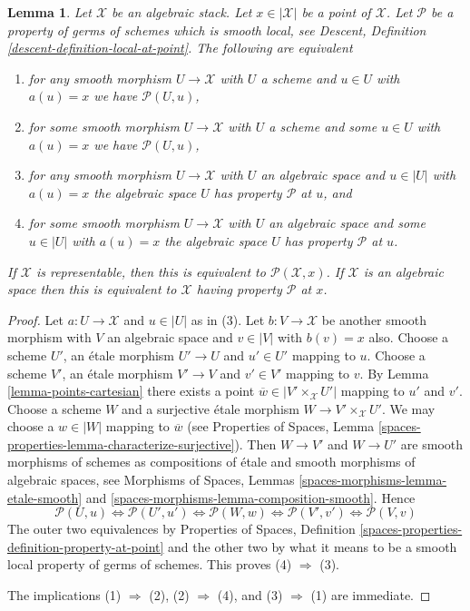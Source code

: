 \documentclass{stacks-project}
\theoremstyle{plain}
\newtheorem{lemma}[subsection]{Lemma}
\theoremstyle{definition}
\theoremstyle{remark}
\numberwithin{equation}{subsection}
\begin{document}
\begin{lemma}
\label{lemma-local-source-target-at-point}
Let $\mathcal{X}$ be an algebraic stack.
Let $x \in |\mathcal{X}|$ be a point of $\mathcal{X}$.
Let $\mathcal{P}$ be a property of germs of schemes which is smooth local, see
Descent, Definition \ref{descent-definition-local-at-point}.
The following are equivalent
\begin{enumerate}
\item for any smooth morphism $U \to \mathcal{X}$ with $U$ a scheme
and $u \in U$ with $a(u) = x$ we have $\mathcal{P}(U, u)$,
\item for some smooth morphism $U \to \mathcal{X}$ with $U$ a scheme
and some $u \in U$ with $a(u) = x$ we have $\mathcal{P}(U, u)$,
\item for any smooth morphism $U \to \mathcal{X}$ with $U$ an algebraic space
and $u \in |U|$ with $a(u) = x$ the algebraic space $U$ has property
$\mathcal{P}$ at $u$, and
\item for some smooth morphism $U \to \mathcal{X}$ with $U$ an
algebraic space and some $u \in |U|$ with $a(u) = x$ the algebraic space
$U$ has property $\mathcal{P}$ at $u$.
\end{enumerate}
If $\mathcal{X}$ is representable, then this is equivalent to
$\mathcal{P}(\mathcal{X}, x)$. If $\mathcal{X}$ is an algebraic space then
this is equivalent to $\mathcal{X}$ having property $\mathcal{P}$ at $x$.
\end{lemma}

\begin{proof}
Let $a : U \to \mathcal{X}$ and $u \in |U|$ as in (3). Let
$b : V \to \mathcal{X}$ be another smooth morphism with $V$ an algebraic
space and $v \in |V|$ with $b(v) = x$ also.
Choose a scheme $U'$, an \'etale morphism $U' \to U$ and $u' \in U'$
mapping to $u$. Choose a scheme $V'$, an \'etale morphism $V' \to V$
and $v' \in V'$ mapping to $v$. By
Lemma \ref{lemma-points-cartesian}
there exists a point $\overline{w} \in |V' \times_\mathcal{X} U'|$
mapping to $u'$ and $v'$. Choose a scheme $W$ and a surjective \'etale
morphism $W \to V' \times_\mathcal{X} U'$. We may choose a
$w \in |W|$ mapping to $\overline{w}$ (see
Properties of Spaces,
Lemma \ref{spaces-properties-lemma-characterize-surjective}).
Then $W \to V'$ and $W \to U'$ are smooth morphisms of schemes
as compositions of \'etale and smooth morphisms of algebraic spaces, see
Morphisms of Spaces, Lemmas \ref{spaces-morphisms-lemma-etale-smooth} and
\ref{spaces-morphisms-lemma-composition-smooth}.
Hence
$$
\mathcal{P}(U, u)
\Leftrightarrow
\mathcal{P}(U', u')
\Leftrightarrow
\mathcal{P}(W, w)
\Leftrightarrow
\mathcal{P}(V', v')
\Leftrightarrow
\mathcal{P}(V, v)
$$
The outer two equivalences by
Properties of Spaces,
Definition \ref{spaces-properties-definition-property-at-point}
and the other two by what it means to be a smooth local property
of germs of schemes. This proves (4) $\Rightarrow$ (3).

\medskip\noindent
The implications (1) $\Rightarrow$ (2), (2) $\Rightarrow$ (4),
and (3) $\Rightarrow$ (1) are immediate.
\end{proof}
\end{document}
